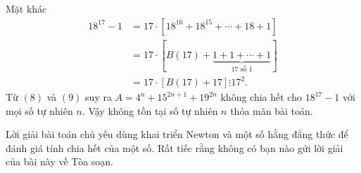 \begin{bt}
{		Mặt khác
		\begin{align*}
		18^{17}-1&=17\cdot \left[18^{16}+18^{15}+\cdots+18+1\right]\\
		&=17\cdot\left[B(17)+\underbrace{1+1+\cdots+1}_{17 \text{ số } 1}\right]\\
		&=17\cdot \left[B(17)+17\right]\vdots  17^2.\tag{9}
		\end{align*}
		Từ $(8)$ và $(9)$ suy ra $A=4^n+15^{2n+1}+19^{2n}$ không chia hết cho $18^{17}-1$ với mọi số tự nhiên $n$. Vậy không tồn tại số tự nhiên $n$ thỏa mãn bài toán.
		\begin{nx}
			Lời giải bài toán chủ yếu dùng khai triển Newton và một số hằng đẳng thức để đánh giá tính chia hết của một số. Rất tiếc rằng không có bạn nào gửi lời giải của bài này về Tòa soạn.
		\end{nx}
	}
\end{bt}

